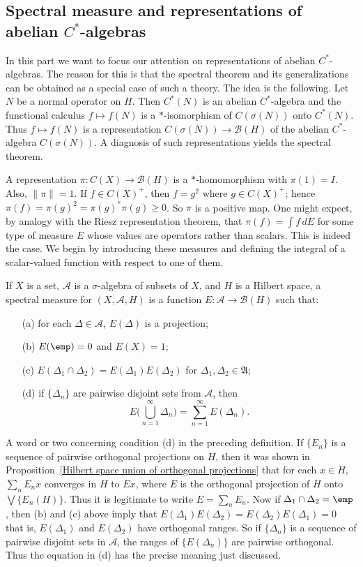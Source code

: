 \subsection{Spectral measure and representations of abelian \boldmath$C^*$-algebras}
In this part we want to focus our attention on representations of abelian $C^*$-algebras. The reason for this is that the spectral theorem and its generalizations can be obtained as a special case of such a theory. The idea is the following. Let $N$ be a normal operator on $H$. Then $C^*(N)$ is an abelian $C^*$-algebra and the functional calculus $f\mapsto f(N)$ is a $*$-isomorphism of $C(\sigma(N))$ onto $C^*(N)$. Thus $f\mapsto f(N)$ is a representation $C(\sigma(N))\to\mathcal{B}(H)$ of the abelian $C^*$-algebra $C(\sigma(N))$. A diagnosis of such representations yields the spectral theorem.\par
A representation $\pi:C(X)\to\mathcal{B}(H)$ is a $*$-homomorphism with $\pi(1)=I$. Also, $\|\pi\|=1$. If $f\in C(X)^+$, then $f=g^2$ where $g\in C(X)^+$; hence $\pi(f)=\pi(g)^2=\pi(g)^*\pi(g)\geq 0$. So $\pi$ is a positive map. One might expect, by analogy with the Riesz representation theorem, that $\pi(f)=\int f\,dE$ for some type of measure $E$ whose values are operators rather than scalars. This is indeed the case. We begin by introducing these measures and defining the integral of a scalar-valued function with respect to one of them.
\begin{definition}
If $X$ is a set, $\mathcal{A}$ is a $\sigma$-algebra of subsets of $X$, and $H$ is a Hilbert space, a spectral measure for $(X,\mathcal{A},H)$ is a function $E:\mathcal{A}\to\mathcal{B}(H)$ such that:
\begin{itemize}
\item[(a)] for each $\Delta\in\mathcal{A}$, $E(\Delta)$ is a projection;
\item[(b)] $E(\emp)=0$ and $E(X)=1$;
\item[(c)] $E(\Delta_1\cap\Delta_2)=E(\Delta_1)E(\Delta_2)$ for $\Delta_1,\Delta_2\in\mathfrak{A}$;
\item[(d)] if $\{\Delta_n\}$ are pairwise disjoint sets from $\mathcal{A}$, then
\[E\Big(\bigcup_{n=1}^{\infty}\Delta_n\Big)=\sum_{n=1}^{\infty}E(\Delta_n).\] 
\end{itemize}
\end{definition}
A word or two concerning condition (d) in the preceding definition. If $\{E_n\}$ is a sequence of pairwise orthogonal projections on $H$, then it was shown in Proposition~\ref{Hilbert space union of orthogonal projections} that for each $x\in H$, $\sum_nE_nx$ converges in $H$ to $Ex$, where $E$ is the orthogonal projection of $H$ onto $\bigvee\{E_n(H)\}$. Thus it is legitimate to write $E=\sum_nE_n$. Now if $\Delta_1\cap\Delta_2=\emp$, then (b) and (c) above imply that $E(\Delta_1)E(\Delta_2)=E(\Delta_2)E(\Delta_1)=0$ that is, $E(\Delta_1)$ and $E(\Delta_2)$ have orthogonal ranges. So if $\{\Delta_n\}$ is a sequence of pairwise disjoint sets in $\mathcal{A}$, the ranges of $\{E(\Delta_n)\}$ are pairwise orthogonal. Thus the equation in (d) has the precise meaning just discussed.
